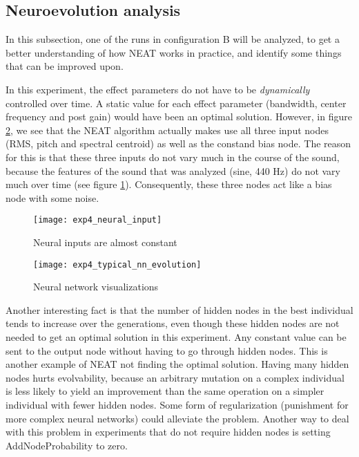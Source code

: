 \subsection{Neuroevolution analysis}

In this subsection, one of the runs in configuration B will be analyzed, to get a better understanding of how NEAT works in practice, and identify some things that can be improved upon.

In this experiment, the effect parameters do not have to be \textit{dynamically} controlled over time. A static value for each effect parameter (bandwidth, center frequency and post gain) would have been an optimal solution. However, in figure \ref{fig:exp4_typical_nn_evolution}, we see that the NEAT algorithm actually makes use all three input nodes (RMS, pitch and spectral centroid) as well as the constand bias node. The reason for this is that these three inputs do not vary much in the course of the sound, because the features of the sound that was analyzed (sine, 440 Hz) do not vary much over time (see figure \ref{fig:exp4_neural_input}). Consequently, these three nodes act like a bias node with some noise.

\begin{figure}[H]
    \centering
    \texttt{[image: exp4\_neural\_input]}
    \caption{Neural inputs are almost constant}
    \label{fig:exp4_neural_input}
\end{figure}

\begin{figure}[H]
    \centering
    \texttt{[image: exp4\_typical\_nn\_evolution]}
    \caption{Neural network visualizations}
    \label{fig:exp4_typical_nn_evolution}
\end{figure}

Another interesting fact is that the number of hidden nodes in the best individual tends to increase over the generations, even though these hidden nodes are not needed to get an optimal solution in this experiment. Any constant value can be sent to the output node without having to go through hidden nodes. This is another example of NEAT not finding the optimal solution. Having many hidden nodes hurts evolvability, because an arbitrary mutation on a complex individual is less likely to yield an improvement than the same operation on a simpler individual with fewer hidden nodes. Some form of regularization (punishment for more complex neural networks) could alleviate the problem. Another way to deal with this problem in experiments that do not require hidden nodes is setting AddNodeProbability to zero.

